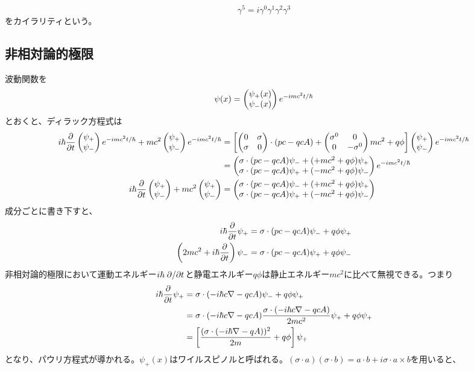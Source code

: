         \[\gamma^5 = i\gamma^0\gamma^1\gamma^2\gamma^3\]
    をカイラリティという。

\subsection{非相対論的極限}
    波動関数を
        \[\psi(x) = \begin{pmatrix} \psi_+(x)\\ \psi_-(x) \end{pmatrix} e^{-imc^2t/\hbar}\]
    とおくと、ディラック方程式は
    \begin{align*}
        i\hbar \pdv{t}\begin{pmatrix} \psi_+\\ \psi_- \end{pmatrix} e^{-imc^2t/\hbar} + mc^2 \begin{pmatrix} \psi_+\\ \psi_- \end{pmatrix}e^{-imc^2t/\hbar}
            &= \left[\begin{pmatrix} 0 & \sigma\\ \sigma & 0 \end{pmatrix} \cdot (pc - qcA) + \begin{pmatrix} \sigma^0 & 0\\ 0 & -\sigma^0 \end{pmatrix} mc^2 + q\phi\right] \begin{pmatrix} \psi_+\\ \psi_- \end{pmatrix} e^{-imc^2t/\hbar}\\
            &= \begin{pmatrix} \sigma \cdot (pc - qcA)\psi_- + (+mc^2 + q\phi)\psi_+\\ \sigma \cdot (pc - qcA)\psi_+ + (-mc^2 + q\phi)\psi_- \end{pmatrix} e^{-imc^2t/\hbar}\\
        i\hbar \pdv{t}\begin{pmatrix} \psi_+\\ \psi_- \end{pmatrix} + mc^2 \begin{pmatrix} \psi_+\\ \psi_- \end{pmatrix}
            &= \begin{pmatrix} \sigma \cdot (pc - qcA)\psi_- + (+mc^2 + q\phi)\psi_+\\ \sigma \cdot (pc - qcA)\psi_+ + (-mc^2 + q\phi)\psi_- \end{pmatrix}
    \end{align*}
    成分ごとに書き下すと、
    \begin{align*}
        i\hbar\pdv{t}\psi_+ &= \sigma \cdot (pc - qcA)\psi_- + q\phi\psi_+\\
        \left(2mc^2 + i\hbar\pdv{t}\right)\psi_- &= \sigma \cdot (pc - qcA)\psi_+ + q\phi\psi_-
    \end{align*}
    非相対論的極限において運動エネルギー$i\hbar\pdv*{t}$と静電エネルギー$q\phi$は静止エネルギー$mc^2$に比べて無視できる。つまり
    \begin{align*}
        i\hbar\pdv{t}\psi_+
            &= \sigma \cdot (-i\hbar c\nabla - qcA)\psi_- + q\phi\psi_+\\
            &= \sigma \cdot (-i\hbar c\nabla - qcA) \frac{\sigma \cdot (-i\hbar c\nabla - qcA)}{2mc^2}\psi_+ + q\phi\psi_+\\
            &= \left[\frac{(\sigma \cdot (-i\hbar\nabla - qA))^2}{2m} + q\phi\right]\psi_+
    \end{align*}
    となり、パウリ方程式が導かれる。$\psi_+(x)$はワイルスピノルと呼ばれる。$(\sigma \cdot a)(\sigma \cdot b) = a \cdot b + i\sigma \cdot a \times b$を用いると、
